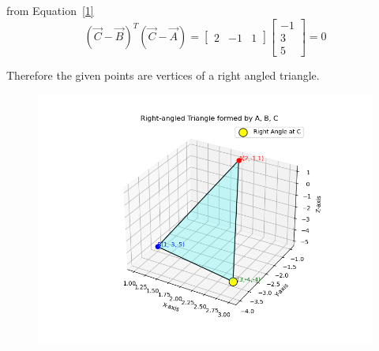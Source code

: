 \documentclass[journal]{IEEEtran}
\begin{document}
from Equation~\eqref{1}
\begin{equation}
(\vec{C}-\vec{B})^{T} (\vec{C}-\vec{A}) = \begin{bmatrix}
2 &-1  & 1
\end{bmatrix}\begin{bmatrix}
-1 \\ 
3 \\ 
5
\end{bmatrix}=0
\end{equation}

Therefore the given points are vertices of a right angled triangle.
\begin{figure}[H]
\begin{center}
\includegraphics[width=0.6\columnwidth]{Figs/Fig1.png}
\end{center}
\caption{}
\label{fig:Fig.1}
\end{figure}
\end{document}
